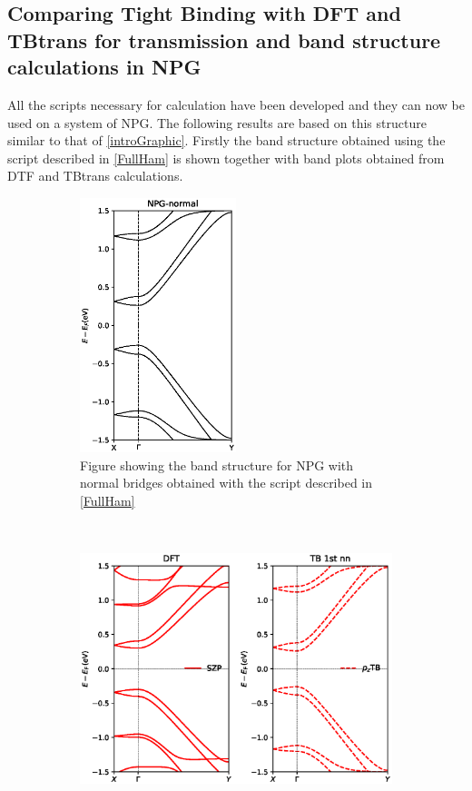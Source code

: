 \subsection{Comparing Tight Binding with DFT and TBtrans for transmission and band structure calculations in NPG}\label{CompTB}
All the scripts necessary for calculation have been developed and they can now be used on a system of NPG.
The following results are based on this structure similar to that of \cref{introGraphic}. Firstly the band structure obtained using the script described in \cref{FullHam} is shown together with  band plots obtained from DTF\cite{} and TBtrans calculations.
\begin{figure}[H]
	\centering
	\begin{subfigure}[t]{0.45\textwidth}
		\centering
		\includegraphics[width=0.5\textwidth]{Figures/NPG-normalBandstructures.eps}
		\caption{Figure showing the band structure for NPG with normal bridges obtained with the script described in \cref{FullHam}}
		\label{bsscript}
	\end{subfigure}
	~  %
	\begin{subfigure}[t]{0.45\textwidth}
		\centering
		\includegraphics[width=\textwidth]{Figures/bands.eps}

\end{subfigure}
\end{figure}
